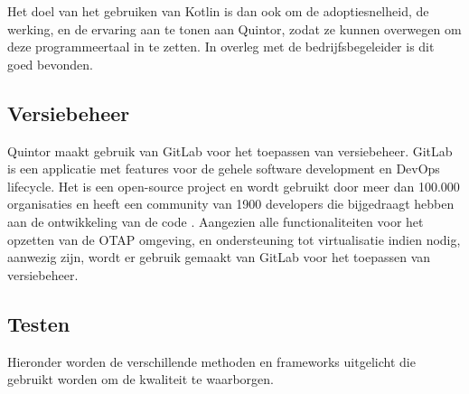 Het doel van het gebruiken van Kotlin is dan ook om de adoptiesnelheid, de werking, en de ervaring aan te tonen aan Quintor, zodat ze kunnen overwegen om deze programmeertaal in te zetten. In overleg met de bedrijfsbegeleider is dit goed bevonden.

\subsection{Versiebeheer}

Quintor maakt gebruik van GitLab voor het toepassen van versiebeheer. GitLab is een applicatie met features voor de gehele software development en DevOps lifecycle. Het is een open-source project en wordt gebruikt door meer dan 100.000 organisaties en heeft een community van 1900 developers die bijgedraagt hebben aan de ontwikkeling van de code \citep{gitlab_about}. Aangezien alle functionaliteiten voor het opzetten van de \gls{OTAP} omgeving, en ondersteuning tot virtualisatie indien nodig, aanwezig zijn, wordt er gebruik gemaakt van GitLab voor het toepassen van versiebeheer.

\newpage
\subsection{Testen}
\label{ontwikkelstraat:testen}
Hieronder worden de verschillende methoden en frameworks uitgelicht die gebruikt worden om de kwaliteit te waarborgen.

